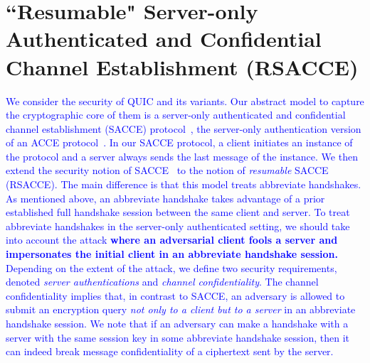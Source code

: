 \section{``Resumable" Server-only Authenticated and Confidential Channel Establishment (RSACCE)} \label{sec:rsacce}
\textcolor{blue}{
We consider the security of QUIC and its variants.
Our abstract model to capture the cryptographic core of them is a server-only
authenticated and confidential channel establishment (SACCE) protocol~\cite{KPW13:SACCE},
the server-only authentication version of an ACCE protocol~\cite{JKSS12:ACCE}.
In our SACCE protocol, a client initiates an instance of the protocol and
a server always sends the last message of the instance.
We then extend the security notion of SACCE~\cite{KPW13:SACCE}
to the notion of \textit{resumable} SACCE (RSACCE).
The main difference is that this model treats abbreviate handshakes.
As mentioned above, an abbreviate handshake takes advantage
of a prior established full handshake session
between the same client and server.
To treat abbreviate handshakes in the server-only authenticated setting,
we should take into account the attack \textbf{where an adversarial client fools a server
and impersonates the initial client in an abbreviate handshake session.}
Depending on the extent of the attack, we define two security requirements,
denoted \textit{server authentications} and \textit{channel confidentiality}.
The channel confidentiality implies that, in contrast to SACCE,
an adversary is allowed to submit
an encryption query \textit{not only to a client but to a server} in an abbreviate handshake session.
We note that if an adversary can make a handshake with a server with the same session
key in some abbreviate handshake session, then it can indeed break message confidentiality of
a ciphertext sent by the server.
}



